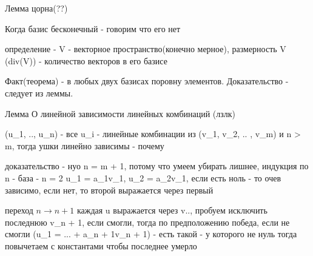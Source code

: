 \documentclass[12pt]{article}
\begin{document}
Лемма цорна(??)

Когда базис бесконечный - говорим что его нет

определение - V - векторное пространство(конечно мерное), размерность V (div(V)) - количество векторов в его базисе 


Факт(теорема) - в любых двух базисах поровну элементов. Доказательство - следует из леммы.

Лемма О линейной зависимости линейных комбинаций  (лзлк)

(u_1, .., u_n) - все u_i - линейные комбинации из (v_1, v_2, .. , v_m) и n > m, тогда ушки линейно зависимы - почему

доказательство - нуо n = m + 1, потому что умеем убирать лишнее, индукция по n - база - n = 2 u_1 = a_1v_1, u_2 = a_2v_1, если есть ноль - то очев зависимо, если нет, то второй выражается через первый

переход $n \rightarrow n + 1$ каждая u выражается через v.., пробуем исключить последнюю v_{n + 1}, если смогли, тогда по предположению победа, если не смогли (u_1 = ... + a_{n + 1}v_{n + 1}) - есть такой - у которого не нуль тогда повычетаем с константами чтобы последнее умерло 
\end{document}
